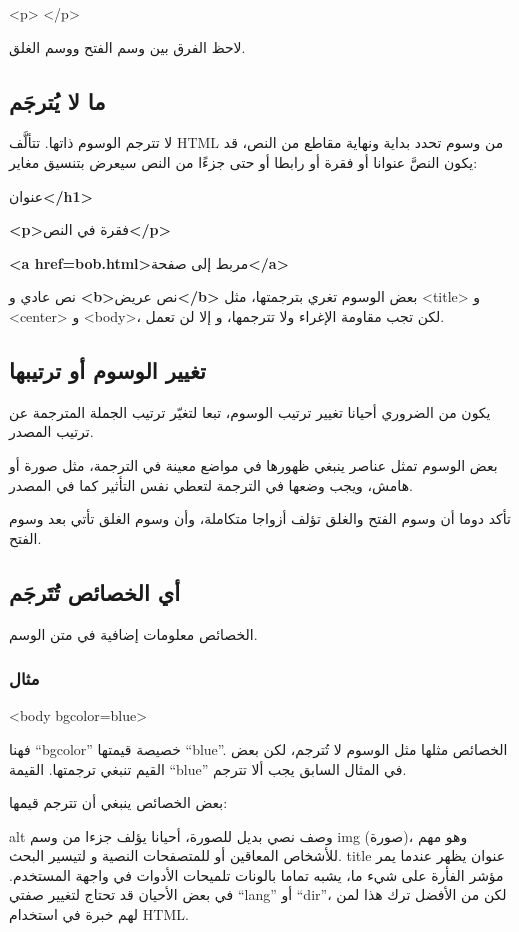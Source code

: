<p> </p>

لاحظ الفرق بين وسم الفتح ووسم الغلق.

\subsection{ما لا يُترجَم}
لا تترجم الوسوم ذاتها. تتألَّف HTML من وسوم تحدد بداية ونهاية مقاطع من
النص، قد يكون النصَّ عنوانا أو فقرة أو رابطا أو حتى جزءًا من النص سيعرض
بتنسيق مغاير:

\startitemize[1]
\item {\bf <h1>}عنوان{\bf </h1>}
\item {\bf <p>}فقرة في النص{\bf </p>}
\item {\bf <a href=bob.html>}مربط إلى صفحة{\bf </a>}
\item نص عادي و {\bf <b>}نص عريض{\bf </b>}
\stopitemize
بعض الوسوم تغري بترجمتها، مثل <title> و <center> و <body>، لكن تجب
مقاومة الإغراء ولا تترجمها، و إلا لن تعمل.

\subsection{تغيير الوسوم أو ترتيبها}
يكون من الضروري أحيانا تغيير ترتيب الوسوم، تبعا لتغيّر ترتيب الجملة
المترجمة عن ترتيب المصدر.

بعض الوسوم تمثل عناصر ينبغي ظهورها في مواضع معينة في الترجمة، مثل صورة
أو هامش، ويجب وضعها في الترجمة لتعطي نفس التأثير كما في المصدر.

تأكد دوما أن وسوم الفتح والغلق تؤلف أزواجا متكاملة، وأن وسوم الغلق تأتي
بعد وسوم الفتح.

\subsection{أي الخصائص تُتَرجَم}
الخصائص معلومات إضافية في متن الوسم.

\subsubsection{مثال}
<body bgcolor=blue>

فهنا “bgcolor” خصيصة قيمتها “blue”. الخصائص مثلها مثل الوسوم لا تُترجم،
لكن بعض القيم تنبغي ترجمتها. القيمة “blue” في المثال السابق يجب ألا
تترجم.

بعض الخصائص ينبغي أن تترجم قيمها:

\starttable[|l|l|]
\HL
\NC {} \NC {}\NC\AR
\HL
\NC alt  \NC وصف نصي بديل للصورة، أحيانا يؤلف جزءا من وسم img (صورة)،
وهو مهم للأشخاص المعاقين أو للمتصفحات النصية و لتيسير البحث.\NC\AR
\HL
\NC title  \NC عنوان يظهر عندما يمر مؤشر الفأرة على شيء ما، يشبه تماما
بالونات تلميحات الأدوات في واجهة المستخدم.\NC\AR
\HL
\stoptable
في بعض الأحيان قد تحتاج لتغيير صفتي “lang” أو “dir”، لكن من الأفضل ترك
هذا لمن لهم خبرة في استخدام HTML.

